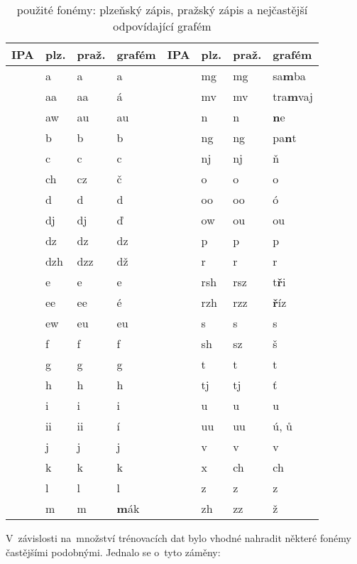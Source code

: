 \begin{table}[htpb]
\begin{center}
\begin{tabular}{|l|l|l|l||l|l|l|l|}
\hline
IPA & plz. & praž. & grafém & IPA & plz. & praž. & grafém \\
\hline
& a & a & a &                 & mg & mg & sa\textbf{m}ba \\
& aa & aa & á &               & mv & mv & tra\textbf{m}vaj \\
& aw & au & au &              & n & n & \textbf{n}e \\
& b & b & b &                 & ng & ng & pa\textbf{n}t \\
& c & c & c &                 & nj & nj & \v{n} \\
& ch & cz & č &               & o & o & o \\
& d & d & d &                 & oo & oo & ó \\
& dj & dj & \v{d} &           & ow & ou & ou \\
& dz & dz & dz &              & p & p & p \\
& dzh & dzz & dž &            & r & r & r \\
& e & e & e &                 & rsh & rsz & t\textbf{\v{r}}i \\
& ee & ee & é &               & rzh & rzz & \textbf{\v{r}}íz \\
& ew & eu & eu &              & s & s & s \\
& f & f & f &                 & sh & sz & š \\
& g & g & g &                 & t & t & t \\
& h & h & h &                 & tj & tj & \v{t} \\
& i & i & i &                 & u & u & u \\
& ii & ii & í &               & uu & uu & ú, \r{u} \\
& j & j & j &                 & v & v & v \\
& k & k & k &                 & x & ch & ch \\
& l & l & l &                 & z & z & z \\
& m & m & \textbf{m}ák &      & zh & zz & ž \\
\hline
\end{tabular}
\caption{použité fonémy: plzeňský zápis, pražský zápis a nejčastější
odpovídající grafém}\label{tab:phones}
\end{center}
\end{table}

V~závislosti na~množství trénovacích dat bylo vhodné nahradit některé fonémy
častějšími podobnými. Jednalo se o~tyto záměny:


